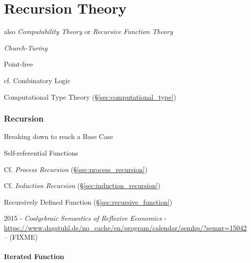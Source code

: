 \part{Recursion Theory}\label{part:recursion_theory}\cite{czoo14}

also \emph{Computability Theory} or \emph{Recursive Function Theory}

\emph{Church-Turing}

Point-free

\fist cf. Combinatory Logic

\fist Computational Type Theory (\S\ref{sec:computational_type})



\section{Recursion}\label{sec:recursion}

Breaking down to reach a Base Case

Self-referential Functions

\fist Cf. \emph{Process Recursion} (\S\ref{sec:process_recursion})

\fist Cf. \emph{Induction Recursion} (\S\ref{sec:induction_recursion})

\fist Recursively Defined Function (\S\ref{sec:recursive_function})

\asterism

2015 - \emph{Coalgebraic Semantics of Reflexive Economics} -
\url{https://www.dagstuhl.de/no_cache/en/program/calendar/semhp/?semnr=15042} --
(FIXME)



\subsection{Iterated Function}\label{sec:iterated_function}

